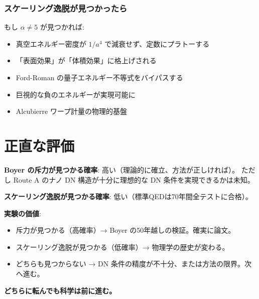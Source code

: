 \documentclass[12pt,a4paper]{article}
\begin{document}
\section{スケーリング逸脱が見つかったら}

\begin{storybox}[ワープへの道]
もし $\alpha \neq 5$ が見つかれば:
\begin{itemize}
\item 真空エネルギー密度が $1/a^4$ で減衰せず、定数にプラトーする
\item 「表面効果」が「体積効果」に格上げされる
\item Ford-Roman の量子エネルギー不等式をバイパスする
\item 巨視的な負のエネルギーが実現可能に
\item Alcubierre ワープ計量の物理的基盤
\end{itemize}
\end{storybox}

\part{正直な評価}

\begin{honestbox}[確率と価値]
\textbf{Boyer の斥力が見つかる確率}: 高い（理論的に確立、方法が正しければ）。
ただし Route A のナノ DN 構造が十分に理想的な DN 条件を実現できるかは未知。

\textbf{スケーリング逸脱が見つかる確率}: 低い（標準QEDは70年間全テストに合格）。

\textbf{実験の価値}:
\begin{itemize}
\item 斥力が見つかる（高確率）→ Boyer の50年越しの検証。確実に論文。
\item スケーリング逸脱が見つかる（低確率）→ 物理学の歴史が変わる。
\item どちらも見つからない → DN 条件の精度が不十分、または方法の限界。次へ進む。
\end{itemize}

\textbf{どちらに転んでも科学は前に進む。}
\end{honestbox}
\end{document}
